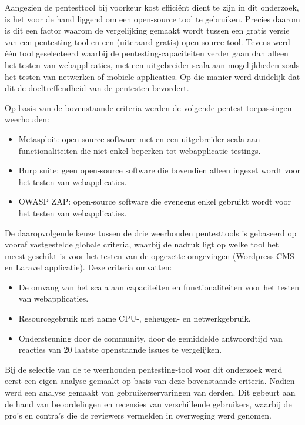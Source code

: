 Aangezien de pentesttool bij voorkeur kost efficiënt dient te zijn in dit onderzoek, is het voor de hand liggend om een open-source tool te gebruiken. Precies daarom 
is dit een factor waarom de vergelijking gemaakt wordt tussen een gratis versie van een pentesting tool en een (uiteraard gratis) open-source tool. 
Tevens werd één tool geselecteerd waarbij de pentesting-capaciteiten verder gaan dan alleen het testen van webapplicaties, met een 
uitgebreider scala aan mogelijkheden zoals het testen van netwerken of mobiele applicaties. Op die manier werd duidelijk dat dit 
de doeltreffendheid van de pentesten bevordert.

Op basis van de bovenstaande criteria werden de volgende pentest toepassingen weerhouden:
\begin{itemize}
    \item Metasploit: open-source software met en een uitgebreider scala aan functionaliteiten die niet enkel beperken tot webapplicatie testings.
    \item Burp suite: geen open-source software die bovendien alleen ingezet wordt voor het testen van webapplicaties.
    \item OWASP ZAP: open-source software die eveneens enkel gebruikt wordt voor het testen van webapplicaties.
\end{itemize}

De daaropvolgende keuze tussen de drie weerhouden pentesttools is gebaseerd op vooraf vastgestelde globale criteria, waarbij de nadruk ligt op welke tool het meest 
geschikt is voor het testen van de opgezette omgevingen (Wordpress CMS en Laravel applicatie). Deze criteria omvatten:
\begin{itemize}
    \item De omvang van het scala aan capaciteiten en functionaliteiten voor het testen van webapplicaties.
    \item Resourcegebruik met name CPU-, geheugen- en netwerkgebruik.
    \item Ondersteuning door de community, door de gemiddelde antwoordtijd van reacties van 20 laatste openstaande issues te vergelijken.
\end{itemize}

Bij de selectie van de te weerhouden pentesting-tool voor dit onderzoek werd eerst een eigen analyse gemaakt op basis van deze bovenstaande criteria. 
Nadien werd een analyse gemaakt van gebruikerservaringen van derden. Dit gebeurt aan de hand van beoordelingen en recensies van 
verschillende gebruikers, waarbij de pro's en contra's die de reviewers vermelden in overweging werd genomen. 

